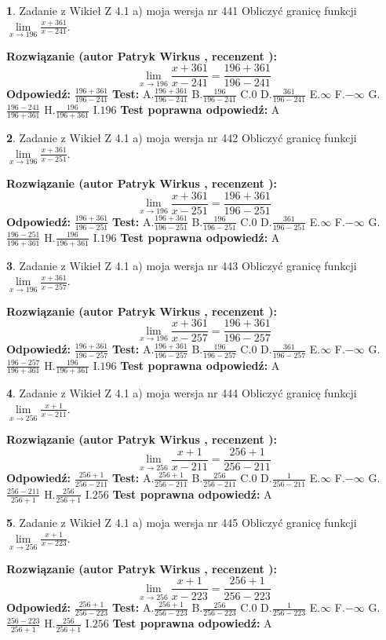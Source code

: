 \documentclass[12pt, a4paper]{article}
\theoremstyle{definition} %
\newtheorem{zad}{}
\newcommand{\zadStart}[1]{\begin{zad}#1\newline}
\newcommand{\zadStop}{\end{zad}}
\newcommand{\rozwStart}[2]{\noindent \textbf{Rozwiązanie (autor #1 , recenzent #2): }\newline}
\newcommand{\rozwStop}{\newline}
\newcommand{\odpStart}{\noindent \textbf{Odpowiedź:}\newline}
\newcommand{\odpStop}{\newline}
\newcommand{\testStart}{\noindent \textbf{Test:}\newline}
\newcommand{\testStop}{\newline}
\newcommand{\kluczStart}{\noindent \textbf{Test poprawna odpowiedź:}\newline}
\newcommand{\kluczStop}{\newline}
\begin{document}
\zadStart{Zadanie z Wikieł Z 4.1 a) moja wersja nr 441}
Obliczyć granicę funkcji $\lim\limits_{x\to196}\frac{x+361}{x-241}$.
\zadStop
\rozwStart{Patryk Wirkus}{}
$$\lim\limits_{x\to196}\frac{x+361}{x-241} = \frac{196+361}{196-241}$$
\rozwStop
\odpStart
$\frac{196+361}{196-241}$
\odpStop
\testStart
A.$\frac{196+361}{196-241}$
B.$\frac{196}{196-241}$
C.$0$
D.$\frac{361}{196-241}$
E.$\infty$
F.$-\infty$
G.$\frac{196-241}{196+361}$
H.$\frac{196}{196+361}$
I.$196$
\testStop
\kluczStart
A
\kluczStop



\zadStart{Zadanie z Wikieł Z 4.1 a) moja wersja nr 442}
Obliczyć granicę funkcji $\lim\limits_{x\to196}\frac{x+361}{x-251}$.
\zadStop
\rozwStart{Patryk Wirkus}{}
$$\lim\limits_{x\to196}\frac{x+361}{x-251} = \frac{196+361}{196-251}$$
\rozwStop
\odpStart
$\frac{196+361}{196-251}$
\odpStop
\testStart
A.$\frac{196+361}{196-251}$
B.$\frac{196}{196-251}$
C.$0$
D.$\frac{361}{196-251}$
E.$\infty$
F.$-\infty$
G.$\frac{196-251}{196+361}$
H.$\frac{196}{196+361}$
I.$196$
\testStop
\kluczStart
A
\kluczStop



\zadStart{Zadanie z Wikieł Z 4.1 a) moja wersja nr 443}
Obliczyć granicę funkcji $\lim\limits_{x\to196}\frac{x+361}{x-257}$.
\zadStop
\rozwStart{Patryk Wirkus}{}
$$\lim\limits_{x\to196}\frac{x+361}{x-257} = \frac{196+361}{196-257}$$
\rozwStop
\odpStart
$\frac{196+361}{196-257}$
\odpStop
\testStart
A.$\frac{196+361}{196-257}$
B.$\frac{196}{196-257}$
C.$0$
D.$\frac{361}{196-257}$
E.$\infty$
F.$-\infty$
G.$\frac{196-257}{196+361}$
H.$\frac{196}{196+361}$
I.$196$
\testStop
\kluczStart
A
\kluczStop



\zadStart{Zadanie z Wikieł Z 4.1 a) moja wersja nr 444}
Obliczyć granicę funkcji $\lim\limits_{x\to256}\frac{x+1}{x-211}$.
\zadStop
\rozwStart{Patryk Wirkus}{}
$$\lim\limits_{x\to256}\frac{x+1}{x-211} = \frac{256+1}{256-211}$$
\rozwStop
\odpStart
$\frac{256+1}{256-211}$
\odpStop
\testStart
A.$\frac{256+1}{256-211}$
B.$\frac{256}{256-211}$
C.$0$
D.$\frac{1}{256-211}$
E.$\infty$
F.$-\infty$
G.$\frac{256-211}{256+1}$
H.$\frac{256}{256+1}$
I.$256$
\testStop
\kluczStart
A
\kluczStop



\zadStart{Zadanie z Wikieł Z 4.1 a) moja wersja nr 445}
Obliczyć granicę funkcji $\lim\limits_{x\to256}\frac{x+1}{x-223}$.
\zadStop
\rozwStart{Patryk Wirkus}{}
$$\lim\limits_{x\to256}\frac{x+1}{x-223} = \frac{256+1}{256-223}$$
\rozwStop
\odpStart
$\frac{256+1}{256-223}$
\odpStop
\testStart
A.$\frac{256+1}{256-223}$
B.$\frac{256}{256-223}$
C.$0$
D.$\frac{1}{256-223}$
E.$\infty$
F.$-\infty$
G.$\frac{256-223}{256+1}$
H.$\frac{256}{256+1}$
I.$256$
\testStop
\kluczStart
A
\kluczStop
\end{document}
